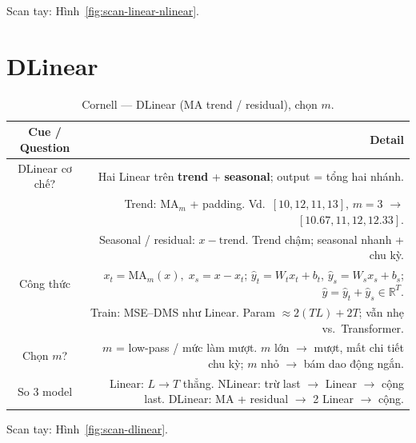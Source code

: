 \documentclass[12pt,a4paper]{article}
\newcommand{\cornellhead}{%
  \toprule
  \textbf{Cue / Question} & \textbf{Detail} \\
  \midrule
}
\begin{document}
\noindent Scan tay: Hình~\ref{fig:scan-linear-nlinear}.

\section{DLinear}

\begin{table}[H]
  \centering
  \caption{Cornell --- DLinear (MA trend / residual), chọn \(m\).}
  \label{tab:cornell-dlinear}
  \small
  \begin{tabularx}{\textwidth}{@{}CD@{}}
    \cornellhead
    DLinear cơ chế? &
    Hai Linear trên \textbf{trend} + \textbf{seasonal}; output = tổng hai nhánh.                        \\
                    & Trend: \(\mathrm{MA}_m\) + padding.
    Vd.\ \([10,12,11,13]\), \(m{=}3\) $\to$ \([10.67,11,12,12.33]\).                                    \\
                    & Seasonal / residual: \(x - \mathrm{trend}\).
    Trend chậm; seasonal nhanh + chu kỳ.                                                                \\
    \addlinespace
    Công thức       &
    \(x_t=\mathrm{MA}_m(x),\; x_s=x-x_t\);
    \(\hat{y}_t=W_t x_t+b_t\), \(\hat{y}_s=W_s x_s+b_s\);
    \(\hat{y}=\hat{y}_t+\hat{y}_s\in\mathbb{R}^{T}\).                                                   \\
                    & Train: MSE--DMS như Linear. Param \(\approx 2(TL)+2T\); vẫn nhẹ vs.\ Transformer. \\
    \addlinespace
    Chọn \(m\)?     &
    \(m\) = low-pass / mức làm mượt.
    \(m\) lớn $\to$ mượt, mất chi tiết chu kỳ;
    \(m\) nhỏ $\to$ bám dao động ngắn.                                                                  \\
    \addlinespace
    So 3 model      &
    Linear: \(L\to T\) thẳng.
    NLinear: trừ last $\to$ Linear $\to$ cộng last.
    DLinear: MA + residual $\to$ 2 Linear $\to$ cộng.                                                   \\
    \bottomrule
  \end{tabularx}
\end{table}

\noindent Scan tay: Hình~\ref{fig:scan-dlinear}.

\end{document}
